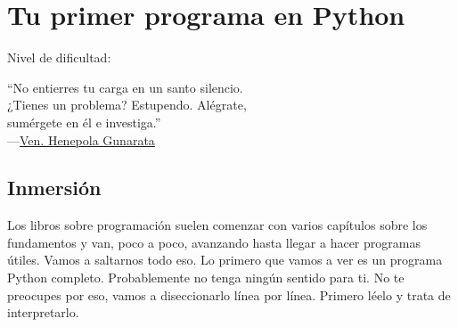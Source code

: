 
\chapter{Tu primer programa en Python}\label{ch:primerprograma}

\noindent
Nivel de dificultad:\difl

\begin{citaCap}
``No entierres tu carga en un santo silencio.\\
¿Tienes un problema? Estupendo. Alégrate, \\
sumérgete en él e investiga.''\\
---\href{http://en.wikiquote.org/wiki/Buddhism}{Ven. Henepola Gunarata}
\end{citaCap}

\section{Inmersión}

Los libros sobre programación suelen comenzar con varios capítulos sobre los fundamentos y van, poco a poco, avanzando hasta llegar a hacer programas útiles. Vamos a saltarnos todo eso. Lo primero que vamos a ver es un programa Python completo. Probablemente no tenga ningún sentido para ti. No te preocupes por eso, vamos a diseccionarlo línea por línea. Primero léelo y trata de interpretarlo.

